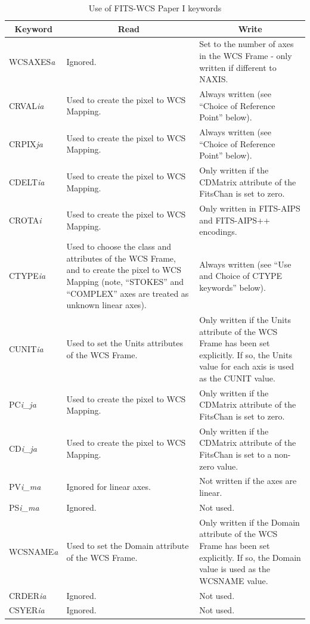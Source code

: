 \documentclass[twoside,11pt]{article}
\newcommand{\fitskey}[3]{{#1}&{#2}&{#3}\\}
\begin{document}
\begin{table}[htbp]
\begin{tabular}{|l|p{2.5in}|p{2.5in}|}
\hline
\multicolumn{1}{|c|}{{\bf Keyword}} & \multicolumn{1}{c|}{{\bf Read}}
& \multicolumn{1}{c|}{{\bf Write}} \\ \hline

\fitskey{WCSAXES\emph{a}}{Ignored.}{Set to the number of axes in the WCS
Frame - only written if different to NAXIS.}

\fitskey{CRVAL\emph{ia}}{Used to create the pixel to WCS
Mapping.}{Always written (see ``Choice of Reference
Point'' below).}

\fitskey{CRPIX\emph{ja}}{Used to create the pixel to WCS Mapping.}{Always
written (see ``Choice of Reference Point'' below).}

\fitskey{CDELT\emph{ia}}{Used to create the pixel to WCS Mapping.}{Only
written if the CDMatrix attribute of the FitsChan is
set to zero.}

\fitskey{CROTA\emph{i}}{Used to create the pixel to WCS Mapping.}{Only
written in FITS-AIPS and FITS-AIPS++ encodings.}

\fitskey{CTYPE\emph{ia}}{Used to choose the class and attributes of the
WCS Frame, and to create the pixel to WCS Mapping (note, ``STOKES'' and
``COMPLEX'' axes are treated as unknown linear axes).}{Always written
(see ``Use and Choice of CTYPE keywords'' below).}

\fitskey{CUNIT\emph{ia}}{Used to set the Units attributes
of the WCS Frame.}{Only written if the Units attribute of the WCS Frame
has been set explicitly. If so, the Units value for each axis is used as
the CUNIT value.}

\fitskey{PC\emph{i\_j}\emph{a}}{Used to create the pixel to WCS
Mapping.}{Only written if the CDMatrix attribute of the FitsChan is set to
zero.}

\fitskey{CD\emph{i\_j}\emph{a}}{Used to create the pixel to WCS
Mapping.}{Only written if the CDMatrix attribute of the FitsChan is set to
a non-zero value.}

\fitskey{PV\emph{i\_ma}}{Ignored for linear axes.}{Not written if the axes
are linear.}

\fitskey{PS\emph{i\_ma}}{Ignored.}{Not used.}

\fitskey{WCSNAME\emph{a}}{Used to set the Domain attribute
of the WCS Frame.}{Only written if the Domain attribute of the WCS Frame
has been set explicitly. If so, the Domain value is used as the WCSNAME
value.}

\fitskey{CRDER\emph{ia}}{Ignored.}{Not used.}

\fitskey{CSYER\emph{ia}}{Ignored.}{Not used.}

\hline
\end{tabular}
\vspace{3.mm}
\caption{Use of FITS-WCS Paper I keywords}
\label{tab:fitspaper1}
\end{table}
\end{document}
